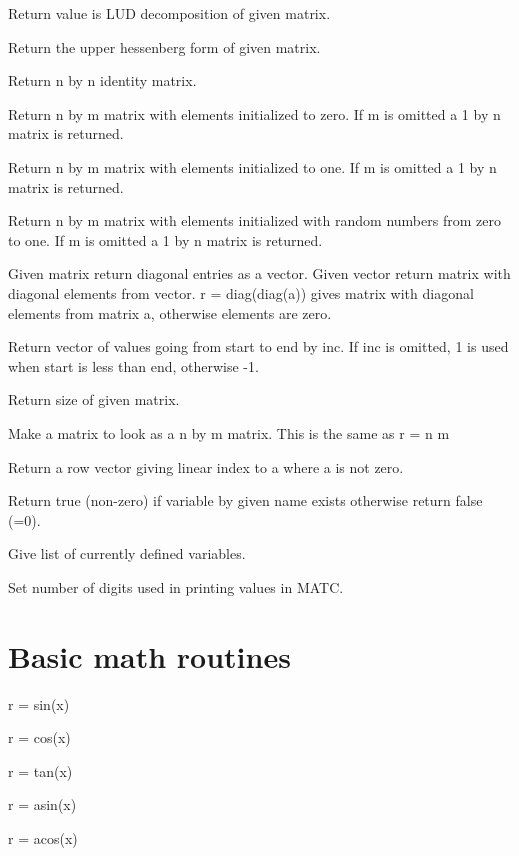 Return value is LUD decomposition of given matrix. 

Return the upper hessenberg form of given matrix. 

Return n by n identity matrix. 

Return n by m matrix with elements initialized to zero. If m is omitted a 1 by n matrix is returned. 

Return n by m matrix with elements initialized to one. If m is omitted a 1 by n matrix is returned. 

Return n by m matrix with elements initialized with random numbers from zero to one. If m is omitted a 1 by n matrix is returned. 

Given matrix return diagonal entries as a vector. Given vector return matrix with diagonal elements from vector. r = diag(diag(a)) gives matrix with diagonal elements from matrix a, otherwise elements are zero. 

Return vector of values going from start to end by inc. If inc is omitted, 1 is used when start is less than end, otherwise -1. 

Return size of given matrix. 

Make a matrix to look as a n by m matrix. This is the same as r = n m %

Return a row vector giving linear index to a where a is not zero. 

Return true (non-zero) if variable by given name exists otherwise return false (=0). 

Give list of currently defined variables. 

Set number of digits used in printing values in MATC. 
\sifend


\section{Basic math routines}

\ttbegin
r = sin(x)

r = cos(x)

r = tan(x)

r = asin(x)

r = acos(x)

